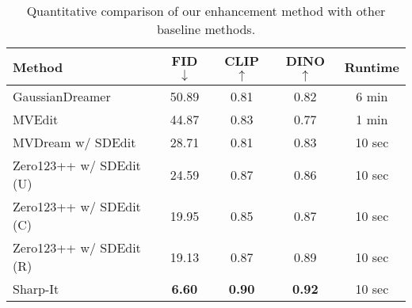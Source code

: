 \begin{table}[t]
    \caption{Quantitative comparison of our enhancement method with other baseline methods.}
    \vspace{-10pt}
    \label{tab:performance_comparison}
    \centering
    \setlength{\tabcolsep}{3pt} %
    {\small %
    \begin{tabular}{@{}lcccc@{}}
        \toprule
        \textbf{Method} & \textbf{FID $\downarrow$} & \textbf{CLIP $\uparrow$} & \textbf{DINO $\uparrow$} & \textbf{Runtime} \\ 
        \midrule
        GaussianDreamer & 50.89 & 0.81 & 0.82 &  6 min \\
        MVEdit & 44.87 & 0.83 & 0.77 &  1 min \\
        MVDream w/ SDEdit & 28.71 & 0.81 & 0.83 &  10 sec \\
        Zero123++ w/ SDEdit (U) & 24.59 & 0.87 & 0.86 &  10 sec \\
        Zero123++ w/ SDEdit (C) & 19.95 & 0.85 & 0.87 &  10 sec \\
        Zero123++ w/ SDEdit (R) & 19.13 & 0.87 & 0.89 &  10 sec \\
        Sharp-It & \textbf{6.60} & \textbf{0.90} & \textbf{0.92} &  10 sec \\
        \bottomrule
    \end{tabular}
    }
    \vspace{-12pt}
\end{table}